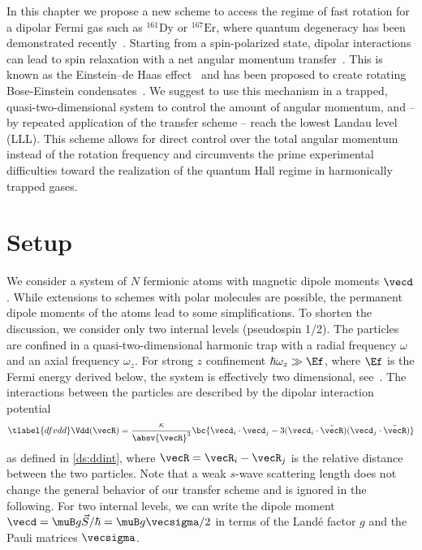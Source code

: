 In this chapter we propose a new scheme to access the regime of fast rotation for a dipolar Fermi gas such as $^{161}\text{Dy}$ or $^{167}\text{Er}$, where quantum degeneracy has been demonstrated recently~\cite{Lu2012,Aikawa2014}. Starting from a spin-polarized state, dipolar interactions can lead to spin relaxation with a net angular momentum transfer~\cite{Hensler2003}. This is known as the Einstein--de Haas effect~\cite{Einstein1915} and has been proposed to create rotating Bose-Einstein condensates~\cite{Santos2006,Kawaguchi2006}. We suggest to use this mechanism in a trapped, quasi-two-dimensional system to control the amount of angular momentum, and -- by repeated application of the transfer scheme -- reach the lowest Landau level (LLL). This scheme allows for direct control over the total angular momentum instead of the rotation frequency and circumvents the prime experimental difficulties toward the realization of the quantum Hall regime in harmonically trapped gases.

\section{Setup}

We consider a system of $N$ fermionic atoms with magnetic dipole moments $\vecd$. While extensions to schemes with polar molecules are possible, the permanent dipole moments of the atoms lead to some simplifications.
To shorten the discussion, we consider only two internal levels (pseudospin 1/2). The particles are confined in a quasi-two-dimensional harmonic trap with a radial frequency $\omega$ and an axial frequency $\omega_z$. For strong $z$ confinement $\hbar\omega_z \gg \Ef$, where $\Ef$ is the Fermi energy derived below, the system is effectively two dimensional, see~.
The interactions between the particles are described by the dipolar interaction potential
\begin{align} \tlabel{dfvdd}
\Vdd(\vecR) = \frac{\kappa}{\absv{\vecR}^3} \bc{ \vecd_i \cdot \vecd_j -3 (\vecd_i \cdot \hat{\vecR})(\vecd_j \cdot \hat{\vecR}) }
\end{align}
as defined in \cref{ds:ddint}, where $\vecR=\vecR_i-\vecR_j$ is the relative distance between the two particles.
Note that a weak $s$-wave scattering length does not change the general behavior of our transfer scheme and is ignored in the following.
For two internal levels, we can write the
dipole moment $\vecd =  \muB g \vec{S} / \hbar = \muB g \vecsigma/2$ in terms of the Land\'e factor $g$ and the Pauli matrices $\vecsigma$.

